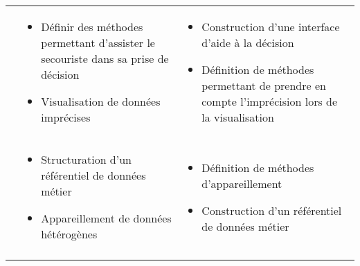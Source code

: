 \begin{tabular}{p{.2\textheight}L{.35\textheight}L{.35\textheight}}
& \begin{minipage}[t]{.35\textheight}
    \begin{itemize}
    \item Définir des méthodes permettant d'assister le secouriste
      dans sa prise de décision
    \item Visualisation de données imprécises
    \end{itemize}
  \end{minipage}& \begin{minipage}[t]{.35\textheight}
    \begin{itemize}
    \item Construction d'une interface d'aide à la décision
    \item Définition de méthodes permettant de prendre en compte
      l'imprécision lors de la visualisation
    \end{itemize}
  \end{minipage} \\
  \addlinespace[.5cm]
& \begin{minipage}[t]{.35\textheight}
    \begin{itemize}
    \item Structuration d'un référentiel de données métier
    \item Appareillement de données hétérogènes
    \end{itemize}
  \end{minipage}& \begin{minipage}[t]{.35\textheight}
    \begin{itemize}
    \item Définition de méthodes d'appareillement
    \item Construction d'un référentiel de données métier
    \end{itemize}
  \end{minipage}\\
  \addlinespace
  \bottomrule
\end{tabular}
